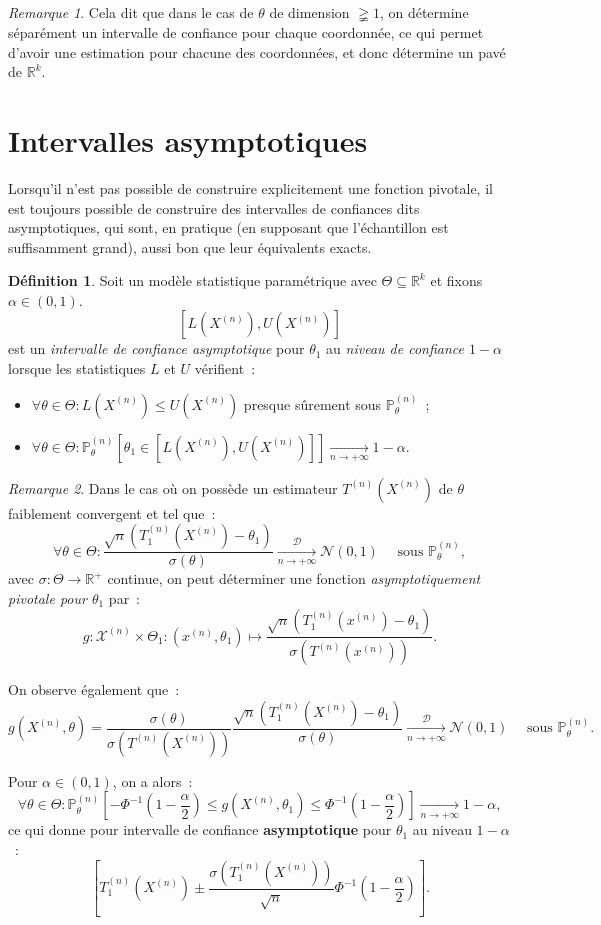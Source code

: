 \documentclass{report}
\renewcommand{\P}{\mathbb P}
\newcommand{\pinfty}{{+\infty}}
\newcommand{\cvgd}{\xrightarrow[n \to \pinfty]{\mathcal D}}
\newcommand{\Nzo}{\mathcal N(0, 1)}
\newcommand{\R}{\mathbb R}
\newcommand{\n}{{(n)}}
\newcommand{\Xn}{{X^\n}}
\newcommand{\Tn}{{T^\n}}
\newcommand{\TnXn}{{\Tn(\Xn)}}
\theoremstyle{definition}
\newtheorem{déf}[thm]{Définition}
\theoremstyle{remark}
\newtheorem*{rmq}{Remarque}
\begin{document}
			\begin{rmq} Cela dit que dans le cas de $\theta$ de dimension $\gneqq 1$, on détermine séparément un intervalle de confiance pour chaque coordonnée,
			ce qui permet d'avoir une estimation pour chacune des coordonnées, et donc détermine un pavé de $\R^k$.
			\end{rmq}

	\section{Intervalles asymptotiques}
		Lorsqu'il n'est pas possible de construire explicitement une fonction pivotale, il est toujours possible de construire des intervalles de confiances dits
		asymptotiques, qui sont, en pratique (en supposant que l'échantillon est suffisamment grand), aussi bon que leur équivalents exacts.

		\begin{déf} Soit un modèle statistique paramétrique avec $\Theta \subseteq \R^k$ et fixons $\alpha \in (0, 1)$.
		\[\left[L(\Xn), U(\Xn)\right]\]
		est un \textit{intervalle de confiance asymptotique} pour $\theta_1$ au \textit{niveau de confiance $1-\alpha$} lorsque les statistiques $L$ et $U$ vérifient~:
		\begin{itemize}
			\item $\forall \theta \in \Theta : L(\Xn) \leq U(\Xn)$ presque sûrement sous $\P_\theta^\n$~;
			\item $\forall \theta \in \Theta : \P_\theta^\n\left[\theta_1 \in \left[L(\Xn), U(\Xn)\right]\right] \xrightarrow[n \to \pinfty]{} 1-\alpha$.
		\end{itemize}
		\end{déf}

		\begin{rmq} Dans le cas où on possède un estimateur $\TnXn$ de $\theta$ faiblement convergent et tel que~:
		\[\forall \theta \in \Theta : \frac {\sqrt n\left(T_1^\n(\Xn) - \theta_1\right)}{\sigma(\theta)} \cvgd \Nzo \quad \text{ sous } \P_\theta^\n,\]
		avec $\sigma : \Theta \to \R^+$ continue, on peut déterminer une fonction \textit{asymptotiquement pivotale pour $\theta_1$} par~:
		\[g : \mathcal X^\n \times \Theta_1 : (x^\n, \theta_1) \mapsto \frac {\sqrt n\left(T_1^\n(x^\n) - \theta_1\right)}{\sigma(T^\n(x^\n))}.\]

		On observe également que~:
		\[g(\Xn, \theta) = \frac {\sigma(\theta)}{\sigma(T^\n(\Xn))} \frac {\sqrt n\left(T_1^\n(\Xn) - \theta_1\right)}{\sigma(\theta)}
			\cvgd \Nzo \quad \text{ sous } \P_\theta^\n.\]

		Pour $\alpha \in (0, 1)$, on a alors~:
		\[\forall \theta \in \Theta :
			\P_\theta^\n\left[-\Phi^{-1}\left(1 - \frac \alpha2\right) \leq g(\Xn, \theta_1) \leq \Phi^{-1}\left(1-\frac \alpha2\right)\right]
			\xrightarrow[n \to \pinfty]{} 1 - \alpha,\]
		ce qui donne pour intervalle de confiance \textbf{asymptotique} pour $\theta_1$ au niveau $1-\alpha$~:
		\[\left[T_1^\n(\Xn) \pm \frac {\sigma(T_1^\n(\Xn))}{\sqrt n}\Phi^{-1}\left(1 - \frac \alpha2\right)\right].\]
		\end{rmq}
\end{document}
